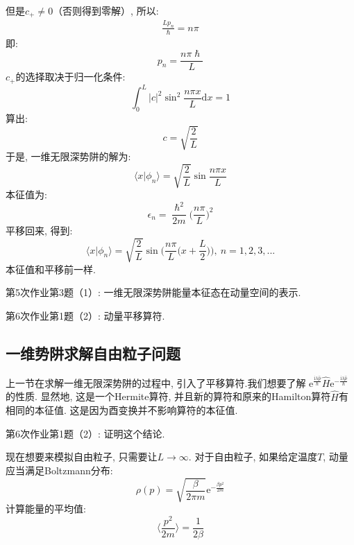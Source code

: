         但是$c_+ \neq 0$（否则得到零解）, 所以:
        \begin{equation}\begin{aligned}
            \frac {Lp_n}{\hslash} = n\pi
        \end{aligned}\end{equation}
        即:
        \[ p_n = \frac {n\pi \hslash}{L} \]
        $c_+$的选择取决于归一化条件: 
        \[ \int_0^L |c|^2 \sin^2{\frac {n\pi x}L}\mathrm{d}x = 1 \]
        算出:
        \[ c = \sqrt{\frac 2L} \]
        于是, 一维无限深势阱的解为:
        \[ \langle x|\phi_n \rangle = \sqrt{\frac 2L} \sin{\frac {n\pi x}L} \]
        本征值为:
        \[ \epsilon_n = \frac {\hslash^2}{2m} \bigg(\frac {n\pi}L\bigg)^2 \]
        平移回来, 得到:
        \[ \langle x|\phi_n \rangle = \sqrt{\frac 2L} \sin{\bigg(\frac {n\pi}L\bigg(x+\frac L2\bigg)\bigg)}, \ n=1,2,3,... \]
        本征值和平移前一样.
        \begin{asg}
            第5次作业第3题（1）: 一维无限深势阱能量本征态在动量空间的表示.
        \end{asg}
        \begin{asg}
            第6次作业第1题（2）: 动量平移算符.
        \end{asg}

    \subsection{一维势阱求解自由粒子问题}
        上一节在求解一维无限深势阱的过程中, 引入了平移算符.我们想要了解
        $\mathrm{e}^{\frac {\mathrm{i}\lambda \hat{p}}{\hslash}} \hat{H} \mathrm{e}^{-\frac {\mathrm{i}\lambda \hat{p}}{\hslash}}$
        的性质. 显然地, 这是一个Hermite算符, 并且新的算符和原来的Hamilton算符$\hat{H}$有相同的本征值. 
        这是因为酉变换并不影响算符的本征值.
        \begin{asg}
            第6次作业第1题（2）: 证明这个结论.
        \end{asg}
        现在想要来模拟自由粒子, 只需要让$L \to \infty$. 对于自由粒子, 如果给定温度$T$, 
        动量应当满足Boltzmann分布:
        \[ \rho(p) = \sqrt{\frac {\beta}{2\pi m}}\mathrm{e}^{-\frac {\beta p^2}{2m}} \]
        计算能量的平均值:
        \[ \langle \frac {p^2}{2m} \rangle = \frac 1{2\beta} \]

